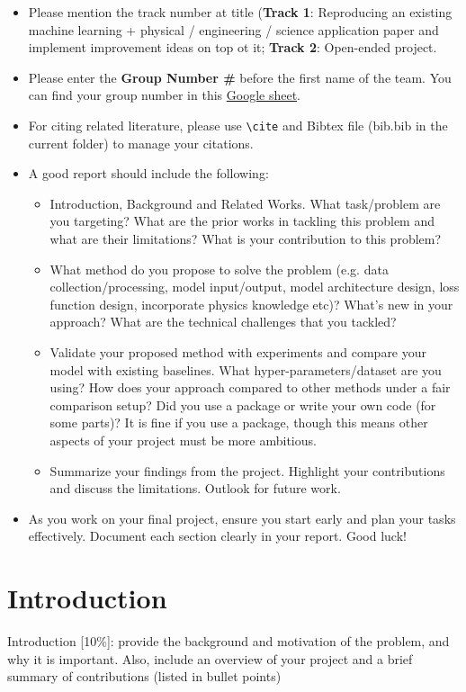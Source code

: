 \documentclass{article}
\newcommand{\instructions}[1]{{\color{blue} #1}}
\begin{document}
\begin{itemize}
    \item Please mention the track number at title (\textbf{Track 1}: Reproducing an existing machine learning + physical / engineering / science application paper and implement improvement ideas on top ot it; \textbf{Track 2}: Open-ended project. 
    \item Please enter the \textbf{Group Number \#} before the first name of the team. You can find your group number in this  \href{https://docs.google.com/spreadsheets/d/1WOi940jN9U6ZHX3xf5tDbw3-igv2bbjXg1W5AETX8cI/edit?usp=sharing}{Google sheet}. 
    \item For citing related literature, please use \verb+\cite+ and Bibtex file (bib.bib in the current folder) to manage your citations.
    \item A good report should include the following:
    \begin{itemize}
        \item Introduction, Background and Related Works. What task/problem are you targeting? What are the prior works in tackling this problem and what are their  limitations? What is your contribution to this problem?
        \item What method do you propose to solve the problem (e.g. data collection/processing, model input/output, model architecture design, loss function design, incorporate physics knowledge etc)? What's new in your approach? What are the technical challenges that you tackled? 
        \item Validate your proposed method with experiments and compare your model with existing baselines. What hyper-parameters/dataset are you using? How does your approach compared to other methods under a fair comparison setup? Did you use a package or write your own code (for some parts)? It is fine if you use a package, though this means other aspects of your project must be more ambitious.
        \item Summarize your findings from the project. Highlight your contributions and discuss the limitations. Outlook for future work.
    \end{itemize}
    \item As you work on your final project, ensure you start early and plan your tasks effectively. Document each section clearly in your report. Good luck!
\end{itemize}



\section{Introduction}
\instructions{Introduction [10\%]: provide the background and motivation of the problem, and why it is important. Also, include an overview of your project and a brief summary of contributions (listed in bullet points)}
\end{document}

